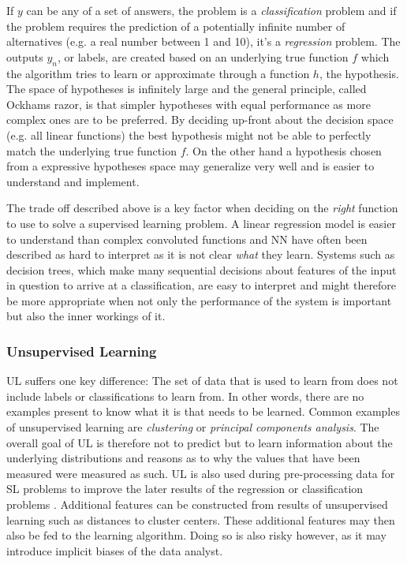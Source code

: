 If $y$ can be any of a set of answers, the problem is a \emph{classification}
problem and if the problem requires the prediction of a potentially infinite
number of alternatives (e.g. a real number between 1 and 10), it's a
\emph{regression} problem. The outputs $y_n$, or labels, are created based on an
underlying true function $f$ which the algorithm tries to learn or approximate
through a function $h$, the hypothesis. The space of hypotheses is infinitely
large and the general principle, called Ockhams razor, is that simpler hypotheses with equal
performance as more complex ones are to be preferred. By deciding up-front about
the decision space (e.g. all linear functions) the best hypothesis might not be able
to perfectly match the underlying true function $f$. On the other hand a
hypothesis chosen from a expressive hypotheses space may generalize very well
and is easier to understand and implement.

The trade off described above is a key factor when deciding on the \emph{right}
function to use to solve a supervised learning problem. A linear regression
model is easier to understand than complex convoluted functions and \ac{NN}
have often been described as hard to interpret as it is not clear \emph{what}
they learn. Systems such as decision trees, which make many sequential decisions
about features of the input in question to arrive at a classification, are easy
to interpret and might therefore be more appropriate when not only the
performance of the system is important but also the inner workings of it.


\subsubsection{Unsupervised Learning}
\acl {UL}  suffers one key difference: The set of data that is used to learn from does not include labels or
classifications to learn from. In other words, there are no examples present to know what it is that needs to be
learned. Common examples of unsupervised learning are \emph{clustering} or \emph{principal components analysis}. The
overall goal of \ac{UL} is therefore not to predict but to learn information about the underlying distributions and
reasons as to why the values that have been measured were measured as such. \ac{UL} is also used during pre-processing
data for \ac{SL} problems to improve the later results of the regression or classification problems
\cite[p.373f.]{james2013introduction}.
Additional features can be constructed from results of unsupervised learning such as distances to cluster centers. These
additional features may then also be fed to the learning algorithm. Doing so is also risky however, as it may introduce
implicit biases of the data analyst.

